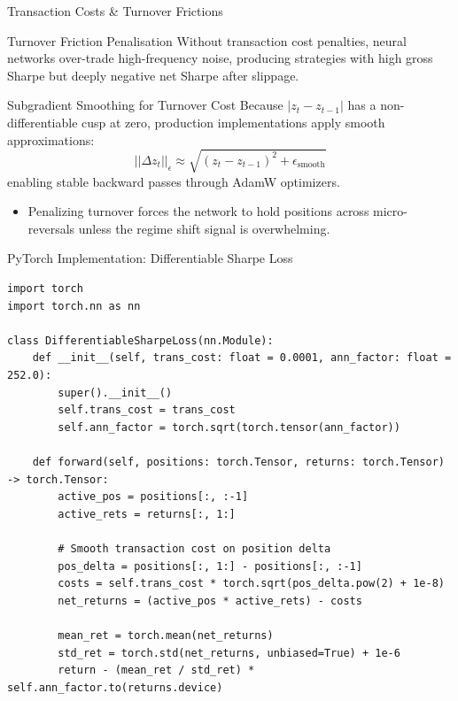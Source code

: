 \documentclass[10pt]{beamer}
\begin{document}
\begin{frame}{Transaction Costs \& Turnover Frictions}
  \begin{block}{Turnover Friction Penalisation}
    Without transaction cost penalties, neural networks over-trade high-frequency noise, producing strategies with high gross Sharpe but deeply negative net Sharpe after slippage.
  \end{block}
  \vspace{0.1cm}
  \begin{block}{Subgradient Smoothing for Turnover Cost}
    Because $|z_t - z_{t-1}|$ has a non-differentiable cusp at zero, production implementations apply smooth approximations:
    \begin{equation*}
      ||\Delta z_t||_{\epsilon} \approx \sqrt{(z_t - z_{t-1})^2 + \epsilon_{\text{smooth}}}
    \end{equation*}
    enabling stable backward passes through AdamW optimizers.
  \end{block}
  \begin{itemize}\scriptsize
    \item Penalizing turnover forces the network to hold positions across micro-reversals unless the regime shift signal is overwhelming.
  \end{itemize}
\end{frame}

\begin{frame}[fragile]{PyTorch Implementation: Differentiable Sharpe Loss}
\begin{lstlisting}
import torch
import torch.nn as nn

class DifferentiableSharpeLoss(nn.Module):
    def __init__(self, trans_cost: float = 0.0001, ann_factor: float = 252.0):
        super().__init__()
        self.trans_cost = trans_cost
        self.ann_factor = torch.sqrt(torch.tensor(ann_factor))

    def forward(self, positions: torch.Tensor, returns: torch.Tensor) -> torch.Tensor:
        active_pos = positions[:, :-1]
        active_rets = returns[:, 1:]
        
        # Smooth transaction cost on position delta
        pos_delta = positions[:, 1:] - positions[:, :-1]
        costs = self.trans_cost * torch.sqrt(pos_delta.pow(2) + 1e-8)
        net_returns = (active_pos * active_rets) - costs
        
        mean_ret = torch.mean(net_returns)
        std_ret = torch.std(net_returns, unbiased=True) + 1e-6
        return - (mean_ret / std_ret) * self.ann_factor.to(returns.device)
\end{lstlisting}
\end{frame}
\end{document}
